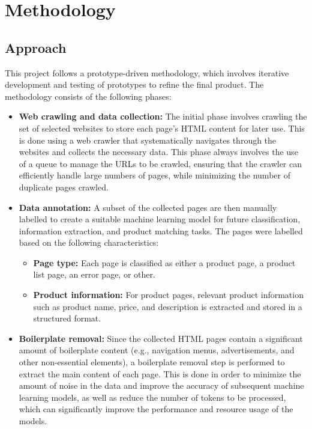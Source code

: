\section{Methodology}\label{sec:methodology}

\subsection{Approach}\label{subsec:approach}

This project follows a prototype-driven methodology, which involves iterative development and testing of prototypes to refine the final product.
The methodology consists of the following phases:

\begin{itemize}
    \item \textbf{Web crawling and data collection:} The initial phase involves crawling the set of selected websites to store each page's HTML content for later use.
    This is done using a web crawler that systematically navigates through the websites and collects the necessary data.
    This phase always involves the use of a queue to manage the URLs to be crawled, ensuring that the crawler can efficiently handle large numbers of pages, while minimizing the number of duplicate pages crawled.

    \item \textbf{Data annotation:} A subset of the collected pages are then manually labelled to create a suitable machine learning model for future classification, information extraction, and product matching tasks.
    The pages were labelled based on the following characteristics:
    \begin{itemize}
        \item \textbf{Page type:} Each page is classified as either a product page, a product list page, an error page, or other.
        \item \textbf{Product information:} For product pages, relevant product information such as product name, price, and description is extracted and stored in a structured format.
    \end{itemize}

    \item \textbf{Boilerplate removal:} Since the collected HTML pages contain a significant amount of boilerplate content (e.g., navigation menus, advertisements, and other non-essential elements), a boilerplate removal step is performed to extract the main content of each page.
    This is done in order to minimize the amount of noise in the data and improve the accuracy of subsequent machine learning models, as well as reduce the number of tokens to be processed, which can significantly improve the performance  and resource usage of the models.


\end{itemize}
